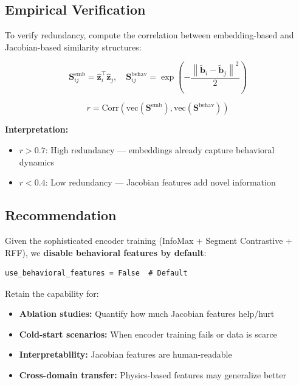 \documentclass[11pt,a4paper]{article}
\newcommand{\vect}[1]{\mathbf{#1}}
\newcommand{\mat}[1]{\mathbf{#1}}
\newcommand{\norm}[1]{\left\|#1\right\|}
\begin{document}
\subsection{Empirical Verification}

To verify redundancy, compute the correlation between embedding-based and Jacobian-based similarity structures:

\begin{equation}
    \mat{S}^{\text{emb}}_{ij} = \hat{\vect{z}}_i^\top \hat{\vect{z}}_j, \quad
    \mat{S}^{\text{behav}}_{ij} = \exp\left(-\frac{\norm{\tilde{\vect{b}}_i - \tilde{\vect{b}}_j}^2}{2}\right)
\end{equation}

\begin{equation}
    r = \text{Corr}\left( \text{vec}(\mat{S}^{\text{emb}}), \text{vec}(\mat{S}^{\text{behav}}) \right)
\end{equation}

\textbf{Interpretation:}
\begin{itemize}
    \item $r > 0.7$: High redundancy — embeddings already capture behavioral dynamics
    \item $r < 0.4$: Low redundancy — Jacobian features add novel information
\end{itemize}

\subsection{Recommendation}

Given the sophisticated encoder training (InfoMax + Segment Contrastive + RFF), we \textbf{disable behavioral features by default}:

\begin{verbatim}
use_behavioral_features = False  # Default
\end{verbatim}

Retain the capability for:
\begin{itemize}
    \item \textbf{Ablation studies:} Quantify how much Jacobian features help/hurt
    \item \textbf{Cold-start scenarios:} When encoder training fails or data is scarce
    \item \textbf{Interpretability:} Jacobian features are human-readable
    \item \textbf{Cross-domain transfer:} Physics-based features may generalize better
\end{itemize}
\end{document}
